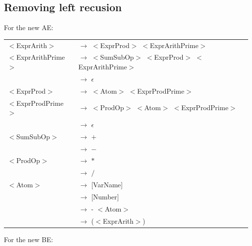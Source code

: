 \documentclass[letterpaper]{article}
\begin{document}
\subsection{Removing left recusion}

For the new AE:


\begin{center}
        \begin{tabular}{l l}
            $<$ExprArith$>$ & $\rightarrow$
            $<$ExprProd$>$ $<$ExprArithPrime$>$ \\

            $<$ExprArithPrime$>$ & $\rightarrow$
            $<$SumSubOp$>$ $<$ExprProd$>$ $<$ExprArithPrime$>$ \\
             & $\rightarrow$ $\epsilon$\\


            $<$ExprProd$>$ & $\rightarrow$ $<$Atom$>$ $<$ExprProdPrime$>$\\

            $<$ExprProdPrime$>$ & $\rightarrow$
            $<$ProdOp$>$ $<$Atom$>$ $<$ExprProdPrime$>$\\
             & $\rightarrow$ $\epsilon$\\


            $<$SumSubOp$>$ & $\rightarrow$ $+$\\
             & $\rightarrow$ $-$\\

            $<$ProdOp$>$ & $\rightarrow$ $*$\\
             & $\rightarrow$ $/$\\

            $<$Atom$>$ & $\rightarrow$ [VarName]\\
             & $\rightarrow$ [Number]\\
             & $\rightarrow$ - $<$Atom$>$\\
             & $\rightarrow$ ($<$ExprArith$>$)\\

        \end{tabular}
\end{center}

For the new BE:
\end{document}
